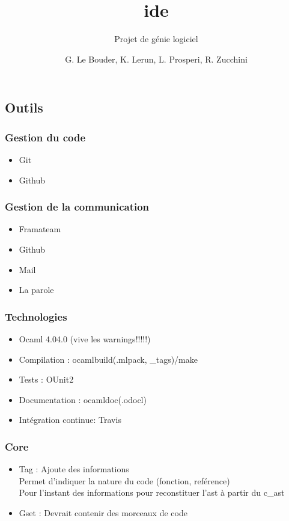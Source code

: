 \documentclass{beamer}
\title{ide}
\subtitle{Projet de génie logiciel}
\author{G. Le Bouder, K. Lerun, L. Prosperi, R. Zucchini}
\begin{document}
\maketitle

\begin{frame}
    \section{Outils}
    \frametitle{Gestion du code}

    \begin{itemize}
        \item Git
        \item Github
    \end{itemize}
\end{frame}

\begin{frame}
    \frametitle{Gestion de la communication}

    \begin{itemize}
        \item Framateam
        \item Github
        \item Mail
        \item La parole
    \end{itemize}
\end{frame}

\begin{frame}
    \frametitle{Technologies}

    \begin{itemize}
        \item Ocaml 4.04.0 (vive les warnings!!!!!)
        \item Compilation : ocamlbuild(.mlpack, \_tags)/make
        \item Tests : OUnit2
        \item Documentation : ocamldoc(.odocl)
        \item Intégration continue: Travis    
    \end{itemize}
\end{frame}

\begin{frame}
    \frametitle{Core}

    \begin{itemize}
        \item Tag : Ajoute des informations \\
        Permet d'indiquer la nature du code (fonction, reférence) \\
        Pour l'instant des informations pour reconstituer l'ast à partir du c\_ast
        \item Gset : Devrait contenir des morceaux de code
    \end{itemize}
\end{frame}
\end{document}
